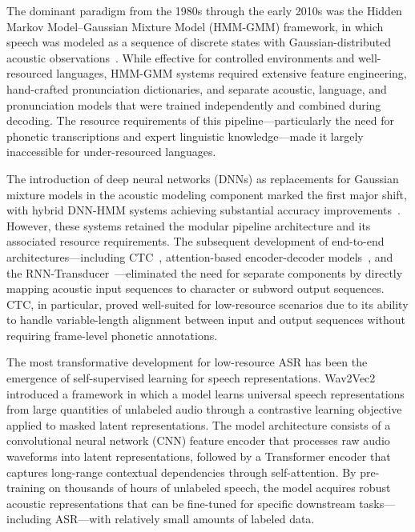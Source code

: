 \documentclass[journal]{IEEEtran}
\begin{document}
The dominant paradigm from the 1980s through the early 2010s was the Hidden Markov Model--Gaussian Mixture Model (HMM-GMM) framework, in which speech was modeled as a sequence of discrete states with Gaussian-distributed acoustic observations~\cite{rabiner1989tutorial}. While effective for controlled environments and well-resourced languages, HMM-GMM systems required extensive feature engineering, hand-crafted pronunciation dictionaries, and separate acoustic, language, and pronunciation models that were trained independently and combined during decoding. The resource requirements of this pipeline---particularly the need for phonetic transcriptions and expert linguistic knowledge---made it largely inaccessible for under-resourced languages.

The introduction of deep neural networks (DNNs) as replacements for Gaussian mixture models in the acoustic modeling component marked the first major shift, with hybrid DNN-HMM systems achieving substantial accuracy improvements~\cite{hinton2012deep}. However, these systems retained the modular pipeline architecture and its associated resource requirements. The subsequent development of end-to-end architectures---including CTC~\cite{graves2006connectionist}, attention-based encoder-decoder models~\cite{chan2016listen}, and the RNN-Transducer~\cite{graves2012sequence}---eliminated the need for separate components by directly mapping acoustic input sequences to character or subword output sequences. CTC, in particular, proved well-suited for low-resource scenarios due to its ability to handle variable-length alignment between input and output sequences without requiring frame-level phonetic annotations.

The most transformative development for low-resource ASR has been the emergence of self-supervised learning for speech representations. Wav2Vec2~\cite{baevski2020wav2vec} introduced a framework in which a model learns universal speech representations from large quantities of unlabeled audio through a contrastive learning objective applied to masked latent representations. The model architecture consists of a convolutional neural network (CNN) feature encoder that processes raw audio waveforms into latent representations, followed by a Transformer encoder that captures long-range contextual dependencies through self-attention. By pre-training on thousands of hours of unlabeled speech, the model acquires robust acoustic representations that can be fine-tuned for specific downstream tasks---including ASR---with relatively small amounts of labeled data.
\end{document}
